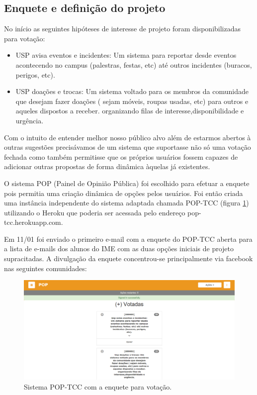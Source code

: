 \subsection{Enquete e definição do projeto}
        \par  No início as seguintes hipóteses de interesse de projeto foram disponibilizadas para votação:
                \begin{itemize}
                \item {USP avisa eventos e incidentes:} Um sistema para reportar desde eventos acontecendo no campus (palestras, festas, etc) até outros incidentes (buracos, perigos, etc).
                \item {USP doações e trocas: } Um sistema voltado para os membros da comunidade que desejam fazer doações ( sejam móveis, roupas usadas, etc) para outros e aqueles dispostos a receber. organizando filas de interesse,disponibilidade e urgência.
                \end{itemize}
        \par Com o intuito de entender melhor nosso público alvo além de estarmos abertos à outras sugestões precisávamos de um sistema que suportasse não só uma votação fechada como também permitisse que os próprios usuários fossem capazes de adicionar outras propostas de forma dinâmica àquelas já existentes.
        \par O sistema POP (Painel de Opinião Pública) foi escolhido para efetuar a enquete pois permitia uma criação dinâmica de opções pelos usuários. Foi então criada uma instância independente do sistema adaptada chamada POP-TCC (figura \ref{fig:pop-tcc}) utilizando o Heroku que poderia ser acessada pelo endereço pop-tcc.herokuapp.com.
        \par Em 11/01 foi enviado o primeiro e-mail com a enquete do POP-TCC aberta para a lista de e-mails dos alunos do IME com as duas opções iniciais de projeto supracitadas. A divulgação da enquete concentrou-se principalmente via facebook nas seguintes comunidades:
\begin{figure}[htb]
\includegraphics[width=15cm]{figuras/pop-tcc}
\caption{\label{fig:pop-tcc} Sistema POP-TCC com a enquete para votação.}
\end{figure}

